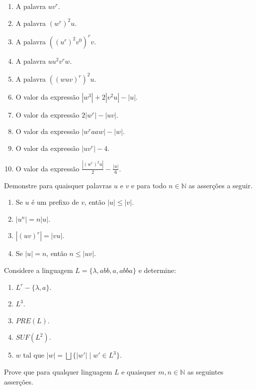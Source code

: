 \begin{enumerate}
	\item A palavra $uv^r$.
	\item A palavra $(w^r)^2u$.
	\item A palavra $((u^r)^2v^0)^rv$.
	\item A palavra $uu^2v^rw$.
	\item A palavra $((wuv)^r)^2u$.
	\item O valor da expressão $|w^3| + 2|v^2u| - |u|$.
	\item O valor da expressão $2|w^r| - |uv|$.
	\item O valor da expressão $|w^raaw| - |w|$.
	\item O valor da expressão $|uv^r| - 4$.
	\item O valor da expressão $\frac{|(w^r)^2u|}{2} - \frac{|u|}{6}$.
\end{enumerate}

\begin{exercise}\label{exerc:LR2}
	Demonstre para quaisquer palavras $u$ e $v$ e para todo $n \in \mathbb{N}$ as asserções a seguir.
\end{exercise}

\begin{enumerate}
	\item Se $u$ é um prefixo de $v$, então $|u| \leq |v|$.
	\item $|u^n| = n|u|$.
	\item $|(uv)^r| = |vu|$.
	\item Se $|u| = n$, então $n \leq |uv|$.
\end{enumerate}

\begin{exercise}\label{exerc:LR3}
	Considere a linguagem $L = \{\lambda, abb, a, abba\}$ e determine:
\end{exercise}

\begin{enumerate}
	\item $L^r - \{\lambda, a\}$.
	\item $L^3$.
	\item $PRE(L)$.
	\item $SUF(L^2)$.
	\item $w$ tal que $|w| = \bigsqcup \{|w'| \mid w' \in L^3\}$.
\end{enumerate}

\begin{exercise}\label{exerc:LR4}
	Prove que para qualquer linguagem $L$ e quaisquer $m,n \in \mathbb{N}$ as seguintes asserções.
\end{exercise}

